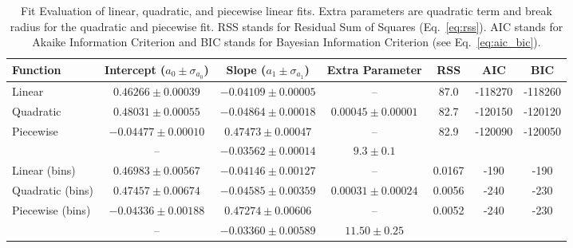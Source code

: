 
\begin{table*}
\caption{
Fit Evaluation of linear, quadratic, and piecewise linear fits.
Extra parameters are quadratic term and break radius for the quadratic and piecewise fit.
RSS stands for Residual Sum of Squares (Eq.~\ref{eq:rss}).
AIC stands for Akaike Information Criterion and BIC stands for Bayesian Information Criterion (see Eq.~\ref{eq:aic_bic}).
}
\label{tab:global_fit_results_comparison}
\begin{tabularx}{\textwidth}{lCCCccc}
\hline
Function & Intercept ($a_0 \pm \sigma_{a_0}$) & Slope ($a_1 \pm \sigma_{a_1}$) & Extra Parameter & RSS & AIC & BIC \\
\hline
Linear & $0.46266 \pm 0.00039$  & $-0.04109 \pm 0.00005$ & -- & 87.0 & -118270  & -118260 \\ 
Quadratic & $0.48031 \pm 0.00055$  & $-0.04864 \pm 0.00018$ & $0.00045 \pm 0.00001$ & 82.7 & -120150  & -120120 \\ 
Piecewise & $-0.04477 \pm 0.00010$ & $0.47473 \pm 0.00047$ & -- & 82.9 & -120090  & -120050 \\ 
 & -- & $-0.03562 \pm 0.00014$ & $9.3 \pm 0.1$ & & & \\ 
\hline
Linear (bins)& $0.46983 \pm 0.00567$  & $-0.04146 \pm 0.00127$ & -- & 0.0167 & -190  & -190 \\ 
Quadratic (bins) & $0.47457 \pm 0.00674$  & $-0.04585 \pm 0.00359$ & $0.00031 \pm 0.00024$ & 0.0056 & -240  & -230 \\ 
Piecewise (bins) & $-0.04336 \pm 0.00188$ & $0.47274 \pm 0.00606$ & -- & 0.0052 & -240  & -230 \\ 
 & -- & $-0.03360 \pm 0.00589$ & $11.50 \pm 0.25$ & & & \\ 
\hline
\end{tabularx}
\end{table*}

